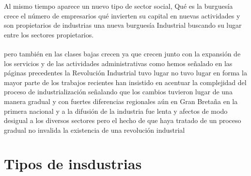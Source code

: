 \documentclass[12pt]{book}++
\begin{document}
Al mismo tiempo aparece un nuevo tipo de sector social, Qué es la burguesía crece el número de empresarios qué invierten su capital en nuevas actividades y son propietarios de industrias una nueva burguesía Industrial buscando su lugar entre los sectores propietarios.
\\
\\
pero también en las clases bajas crecen ya que crecen junto con la expansión de los servicios y de las actividades administrativas como hemos señalado en las páginas precedentes la Revolución Industrial tuvo lugar no tuvo lugar en forma la mayor parte de los trabajos recientes han insistido en acentuar la complejidad del proceso de industrialización señalando que los cambios tuvieron lugar de una manera gradual y con fuertes diferencias regionales aún en Gran Bretaña en la primera nacional y a la difusión de la industria fue lenta y afectos de modo desigual a los diversos sectores pero el hecho de que haya tratado de un proceso gradual no invalida la existencia de una revolución industrial


\section{Tipos de insdustrias}
\end{document}
